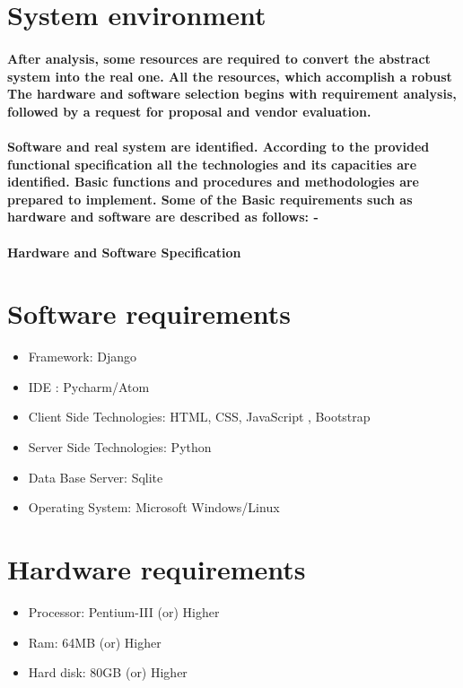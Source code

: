 \documentclass[12pt]{report}
\begin{document}
        \section{System environment}
        \paragraph
        {
        After analysis, some resources are required to convert the abstract system into the real one. All the resources, which accomplish a robust The hardware and software selection begins with requirement analysis, followed by a request for proposal and vendor evaluation.
        }
        \paragraph
        {
        Software and real system are identified. According to the provided functional specification all the technologies and its capacities are identified. Basic functions and procedures and methodologies are prepared to implement. Some of the Basic requirements such as hardware and software are described as follows: -
        }
        \paragraph{\textbf{Hardware and Software Specification}}
        \section{Software requirements}
        \begin{itemize}
            \item Framework: Django
            \item IDE : Pycharm/Atom
            \item Client Side Technologies: HTML, CSS, JavaScript , Bootstrap
            \item Server Side Technologies: Python
            \item Data Base Server: Sqlite
            \item Operating System: Microsoft Windows/Linux 
        \end{itemize}
        
        
        \section{Hardware requirements}
       \begin{itemize}
           \item Processor: Pentium-III (or) Higher
           \item Ram: 64MB (or) Higher
           \item Hard disk: 80GB (or) Higher
       \end{itemize}
\end{document}
